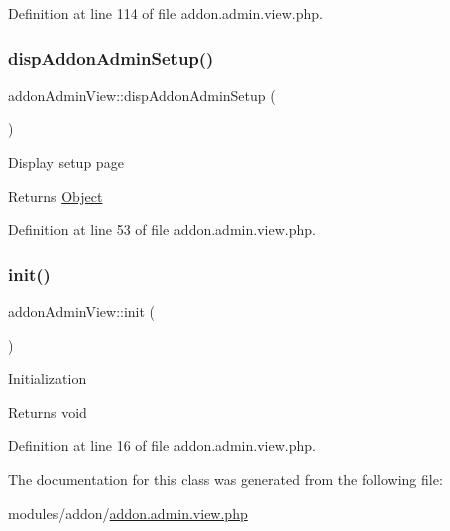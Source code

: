 Definition at line 114 of file addon.\+admin.\+view.\+php.

\hypertarget{classaddonAdminView_a14aef8b4e451f5eac1872ddc00530d50}{}\label{classaddonAdminView_a14aef8b4e451f5eac1872ddc00530d50} 
\subsubsection{\texorpdfstring{disp\+Addon\+Admin\+Setup()}{dispAddonAdminSetup()}}
{\footnotesize\ttfamily addon\+Admin\+View\+::disp\+Addon\+Admin\+Setup (\begin{DoxyParamCaption}{ }\end{DoxyParamCaption})}

Display setup page

\begin{DoxyReturn}{Returns}
\hyperlink{classObject}{Object} 
\end{DoxyReturn}


Definition at line 53 of file addon.\+admin.\+view.\+php.

\hypertarget{classaddonAdminView_a2a2cd475d7a4d6111e7e9b3dafb4de01}{}\label{classaddonAdminView_a2a2cd475d7a4d6111e7e9b3dafb4de01} 
\subsubsection{\texorpdfstring{init()}{init()}}
{\footnotesize\ttfamily addon\+Admin\+View\+::init (\begin{DoxyParamCaption}{ }\end{DoxyParamCaption})}

Initialization

\begin{DoxyReturn}{Returns}
void 
\end{DoxyReturn}


Definition at line 16 of file addon.\+admin.\+view.\+php.



The documentation for this class was generated from the following file\+:\begin{DoxyCompactItemize}
\item 
modules/addon/\hyperlink{addon_8admin_8view_8php}{addon.\+admin.\+view.\+php}\end{DoxyCompactItemize}
